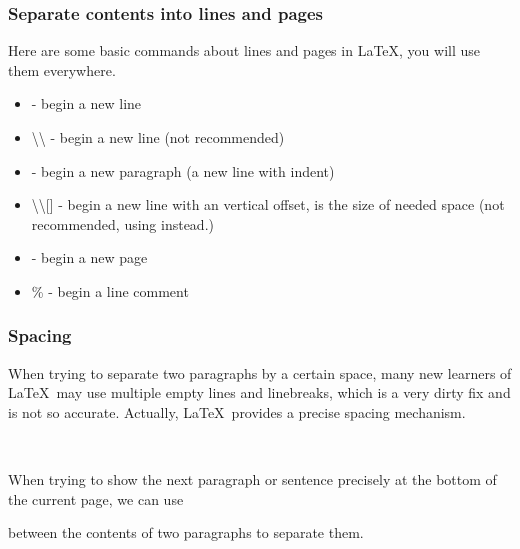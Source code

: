 \begin{frame}
	\frametitle{Separate contents into lines and pages}
	Here are some basic commands about lines and pages in \LaTeX,  you will use them everywhere.
	\begin{itemize}
		\item {} - begin a new line
		\item \alert{\textbackslash\textbackslash} - begin a new line (not recommended\footnotemark[1])
		\item {} - begin a new paragraph (a new line with indent)
		\item \alert{\textbackslash\textbackslash [}\alert{]} - begin a new line with an vertical offset,  is the size of needed space  (not recommended, using  \LC{\vspace} instead.)
		\item {} - begin a new page
		\item \alert{\%} - begin a line comment
	\end{itemize}
\end{frame}

\begin{frame}[fragile]
	\frametitle{Spacing}
	When trying to separate two paragraphs by a certain space, many new learners of \LaTeX\ may use multiple empty lines and linebreaks, which is a very dirty fix and is not so accurate. Actually, \LaTeX\ provides a precise spacing mechanism.
	\begin{command}
		\LC{\vspace{space}}\\
		\LC{\vspace*{space}}
	\end{command}
	When trying to show the next paragraph or sentence precisely at the bottom of the current page, we can use
	\begin{command}
		\LC{\vfill}
	\end{command}
	between the contents of two paragraphs to separate them.
\end{frame}

